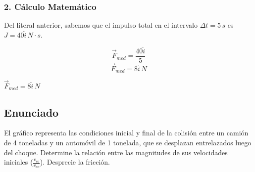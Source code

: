 \documentclass[12pt, a4paper]{article}
\begin{document}
\subsubsection*{2. Cálculo Matemático}
Del literal anterior, sabemos que el impulso total en el intervalo $\Delta t = 5 \, \si{s}$ es $J = 40 \hat{i} \, \si{N \cdot s}$.

$$ \vec{F}_{med} = \frac{40 \hat{i}}{5} $$
$$ \vec{F}_{med} = 8 \hat{i} \, \si{N} $$

\begin{tcolorbox}[colback=green!5!white, colframe=green!50!black, title=Respuesta Final]
\centering \Large $\vec{F}_{med} = 8 \hat{i} \, \si{N}$
\end{tcolorbox}

\newpage

\subsection*{Enunciado}
El gráfico representa las condiciones inicial y final de la colisión entre un camión de 4 toneladas y un automóvil de 1 tonelada, que se desplazan entrelazados luego del choque. Determine la relación entre las magnitudes de sus velocidades iniciales ($\frac{v_{co}}{v_{ao}}$). Desprecie la fricción.

\begin{center}
\end{center}
\end{document}
